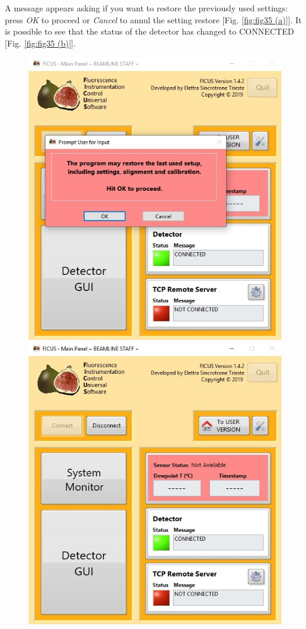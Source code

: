 \documentclass[a4paper,12pt,oneside,pdflatex,italian,final,twocolumn]{article}
\begin{document}
A message appears asking if you want to restore the previously used settings: press \textit{OK} to proceed or \textit{Cancel} to annul the setting restore [Fig. \ref{fig:fig35 (a)}]. It is possible to see that the status of the detector has changed to CONNECTED [Fig. \ref{fig:fig35 (b)}].

\begin{figure}[h]
\centering
\subfloat
{\includegraphics[scale=0.4]{Cattura69.jpg}} \quad
\subfloat
{\includegraphics[scale=0.4]{Cattura70.jpg}} \\

\end{figure}
\end{document}
